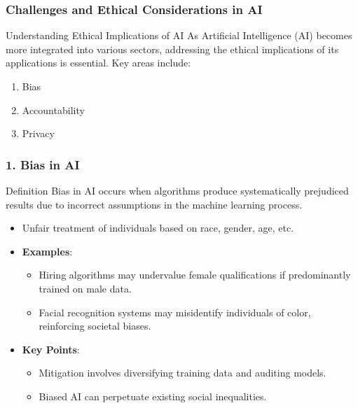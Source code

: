 \documentclass[aspectratio=169]{beamer}
\begin{document}
\begin{frame}[fragile]
    \frametitle{Challenges and Ethical Considerations in AI}
    \begin{block}{Understanding Ethical Implications of AI}
        As Artificial Intelligence (AI) becomes more integrated into various sectors, addressing the ethical implications of its applications is essential. Key areas include:
        \begin{enumerate}
            \item Bias
            \item Accountability
            \item Privacy
        \end{enumerate}
    \end{block}
\end{frame}

\begin{frame}[fragile]
    \frametitle{1. Bias in AI}
    \begin{block}{Definition}
        Bias in AI occurs when algorithms produce systematically prejudiced results due to incorrect assumptions in the machine learning process.
    \end{block}
    \begin{itemize}
        \item Unfair treatment of individuals based on race, gender, age, etc.
        \item \textbf{Examples}:
        \begin{itemize}
            \item Hiring algorithms may undervalue female qualifications if predominantly trained on male data.
            \item Facial recognition systems may misidentify individuals of color, reinforcing societal biases.
        \end{itemize}
        \item \textbf{Key Points}:
        \begin{itemize}
            \item Mitigation involves diversifying training data and auditing models.
            \item Biased AI can perpetuate existing social inequalities.
        \end{itemize}
    \end{itemize}
\end{frame}
\end{document}
